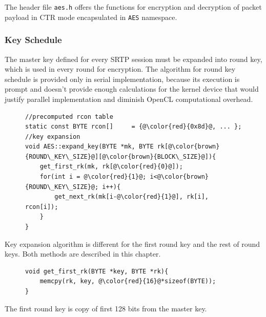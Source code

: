 The header file \texttt{aes.h} offers the functions for encryption and 
decryption of packet payload in CTR mode encapsulated in \texttt{AES} namespace.

\subsubsection*{Key Schedule}
The master key defined for every SRTP session must be expanded into round key,
which is used in every round for encryption. The algorithm for round key schedule
is provided only in serial implementation, because its execution is prompt and
doesn't provide enough calculations for the kernel device that would justify
parallel implementation and diminish OpenCL computational overhead.

\begin{figure}[H]
\begin{lstlisting}
//precomputed rcon table
static const BYTE rcon[]     = {@\color{red}{0x8d}@, ... };
//key expansion
void AES::expand_key(BYTE *mk, BYTE rk[@\color{brown}{ROUND\_KEY\_SIZE}@][@\color{brown}{BLOCK\_SIZE}@]){
    get_first_rk(mk, rk[@\color{red}{0}@]);
    for(int i = @\color{red}{1}@; i<@\color{brown}{ROUND\_KEY\_SIZE}@; i++){
        get_next_rk(mk[i-@\color{red}{1}@], rk[i], rcon[i]);
    }
}
\end{lstlisting}
\end{figure}

Key expansion algorithm is different for the first round key and the rest of
round keys. Both methods are described in this chapter.
 
\begin{figure}[H]
\begin{lstlisting}
void get_first_rk(BYTE *key, BYTE *rk){
    memcpy(rk, key, @\color{red}{16}@*sizeof(BYTE));
}
\end{lstlisting}
\end{figure}

The first round key is copy of first 128 bits from the master key. 

